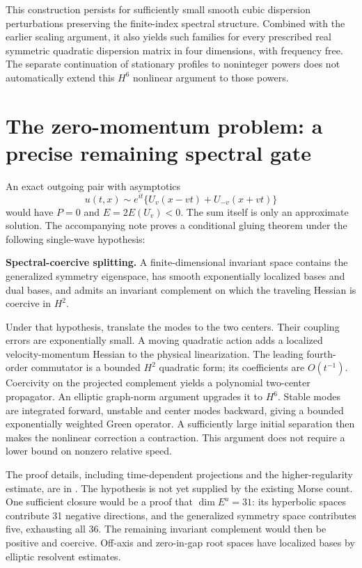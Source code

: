 \documentclass[11pt,a4paper]{article}
\theoremstyle{remark}\newtheorem{remark}[theorem]{Remark}
\begin{document}
This construction persists for sufficiently small smooth cubic dispersion perturbations preserving the finite-index spectral structure. Combined with the earlier scaling argument, it also yields such families for every prescribed real symmetric quadratic dispersion matrix in four dimensions, with frequency free. The separate continuation of stationary profiles to noninteger powers does not automatically extend this $H^6$ nonlinear argument to those powers.

\section{The zero-momentum problem: a precise remaining spectral gate}
An exact outgoing pair with asymptotics
\[
 u(t,x)\sim e^{it}\{U_v(x-vt)+U_{-v}(x+vt)\}
\]
would have $P=0$ and $E=2E(U_v)<0$. The sum itself is only an approximate solution. The accompanying note proves a conditional gluing theorem under the following single-wave hypothesis:

\medskip\noindent
\textbf{Spectral-coercive splitting.} A finite-dimensional invariant space contains the generalized symmetry eigenspace, has smooth exponentially localized bases and dual bases, and admits an invariant complement on which the traveling Hessian is coercive in $H^2$.
\medskip

Under that hypothesis, translate the modes to the two centers. Their coupling errors are exponentially small. A moving quadratic action adds a localized velocity-momentum Hessian to the physical linearization. The leading fourth-order commutator is a bounded $H^2$ quadratic form; its coefficients are $O(t^{-1})$. Coercivity on the projected complement yields a polynomial two-center propagator. An elliptic graph-norm argument upgrades it to $H^6$. Stable modes are integrated forward, unstable and center modes backward, giving a bounded exponentially weighted Green operator. A sufficiently large initial separation then makes the nonlinear correction a contraction. This argument does not require a lower bound on nonzero relative speed.

The proof details, including time-dependent projections and the higher-regularity estimate, are in . The hypothesis is not yet supplied by the existing Morse count. One sufficient closure would be a proof that $\dim E^u=31$: its hyperbolic spaces contribute 31 negative directions, and the generalized symmetry space contributes five, exhausting all 36. The remaining invariant complement would then be positive and coercive. Off-axis and zero-in-gap root spaces have localized bases by elliptic resolvent estimates.
\end{document}
